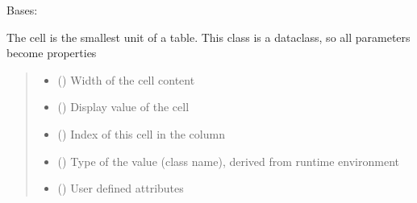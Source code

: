 \documentclass[letterpaper,10pt,english]{sphinxmanual}
\begin{document}

\begin{savenotes}\begin{fulllineitems}
\label{\detokenize{eezz:eezz.table.TTableCell}}
\pysigstartsignatures
{}
\pysigstopsignatures
\sphinxAtStartPar
Bases: 

\sphinxAtStartPar
The cell is the smallest unit of a table. This class is a dataclass, so all
parameters become properties
\begin{quote}\begin{description}
\begin{itemize}
\item {} 
\sphinxAtStartPar
{} () \textendash{} Width of the cell content

\item {} 
\sphinxAtStartPar
{} () \textendash{} Display value of the cell

\item {} 
\sphinxAtStartPar
{} () \textendash{} Index of this cell in the column

\item {} 
\sphinxAtStartPar
{} () \textendash{} Type of the value (class name), derived from runtime environment

\item {} 
\sphinxAtStartPar
{} () \textendash{} User defined attributes

\end{itemize}

\end{description}\end{quote}


\end{fulllineitems}
\end{savenotes}
\end{document}
